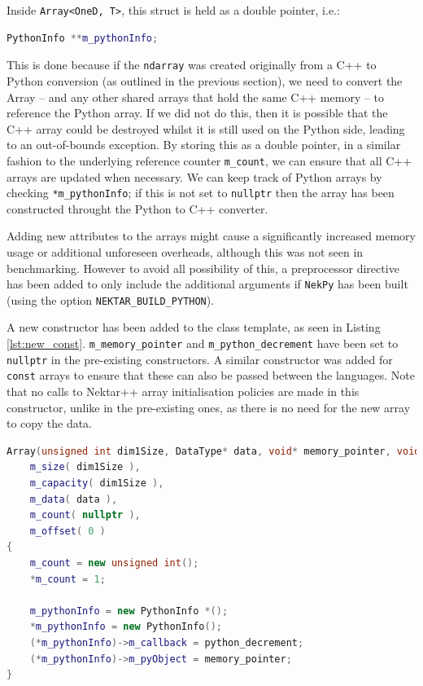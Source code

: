 Inside \texttt{Array<OneD, T>}, this struct is held as a double pointer, i.e.:
\begin{lstlisting}[language=C++]
PythonInfo **m_pythonInfo;
\end{lstlisting}
This is done because if the \texttt{ndarray} was created originally from a C++
to Python conversion (as outlined in the previous section), we need to convert
the Array -- and any other shared arrays that hold the same C++ memory -- to
reference the Python array. If we did not do this, then it is possible that the
C++ array could be destroyed whilst it is still used on the Python side, leading
to an out-of-bounds exception. By storing this as a double pointer, in a similar
fashion to the underlying reference counter \texttt{m\_count}, we can ensure
that all C++ arrays are updated when necessary. We can keep track of Python
arrays by checking \texttt{*m\_pythonInfo}; if this is not set to
\texttt{nullptr} then the array has been constructed throught the Python to C++
converter.

Adding new attributes to the arrays might cause a significantly increased memory
usage or additional unforeseen overheads, although this was not seen in
benchmarking. However to avoid all possibility of this, a preprocessor directive
has been added to only include the additional arguments if \texttt{NekPy} has
been built (using the option \texttt{NEKTAR\_BUILD\_PYTHON}).

A new constructor has been added to the class template, as seen in Listing
\ref{lst:new_const}.  \texttt{m\_memory\_pointer} and
\texttt{m\_python\_decrement} have been set to \texttt{nullptr} in the
pre-existing constructors. A similar constructor was added for \texttt{const}
arrays to ensure that these can also be passed between the languages. Note that
no calls to Nektar++ array initialisation policies are made in this constructor,
unlike in the pre-existing ones, as there is no need for the new array to copy
the data.

\begin{lstlisting}[caption={New constructor for initialising arrays created through the Python to C++ converter method.}, label={lst:new_const}, language=C++]
Array(unsigned int dim1Size, DataType* data, void* memory_pointer, void (*python_decrement)(void *)) :
    m_size( dim1Size ),
    m_capacity( dim1Size ),
    m_data( data ),
    m_count( nullptr ),
    m_offset( 0 )                               
{
    m_count = new unsigned int(); 
    *m_count = 1;

    m_pythonInfo = new PythonInfo *();
    *m_pythonInfo = new PythonInfo();
    (*m_pythonInfo)->m_callback = python_decrement;
    (*m_pythonInfo)->m_pyObject = memory_pointer;
}
\end{lstlisting}

